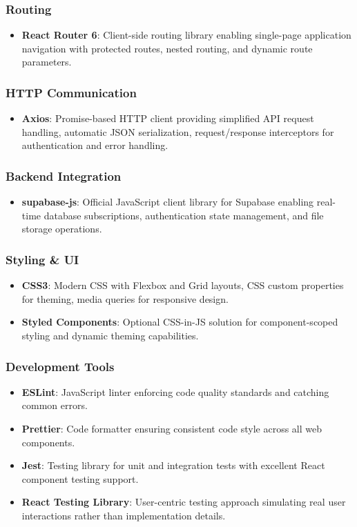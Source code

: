 \subsubsection{Routing}
\begin{itemize}
    \item \textbf{React Router 6}: Client-side routing library enabling single-page application navigation with protected routes, nested routing, and dynamic route parameters.
\end{itemize}

\subsubsection{HTTP Communication}
\begin{itemize}
    \item \textbf{Axios}: Promise-based HTTP client providing simplified API request handling, automatic JSON serialization, request/response interceptors for authentication and error handling.
\end{itemize}

\subsubsection{Backend Integration}
\begin{itemize}
    \item \textbf{supabase-js}: Official JavaScript client library for Supabase enabling real-time database subscriptions, authentication state management, and file storage operations.
\end{itemize}

\subsubsection{Styling \& UI}
\begin{itemize}
    \item \textbf{CSS3}: Modern CSS with Flexbox and Grid layouts, CSS custom properties for theming, media queries for responsive design.
    \item \textbf{Styled Components}: Optional CSS-in-JS solution for component-scoped styling and dynamic theming capabilities.
\end{itemize}

\subsubsection{Development Tools}
\begin{itemize}
    \item \textbf{ESLint}: JavaScript linter enforcing code quality standards and catching common errors.
    \item \textbf{Prettier}: Code formatter ensuring consistent code style across all web components.
    \item \textbf{Jest}: Testing library for unit and integration tests with excellent React component testing support.
    \item \textbf{React Testing Library}: User-centric testing approach simulating real user interactions rather than implementation details.
\end{itemize}

